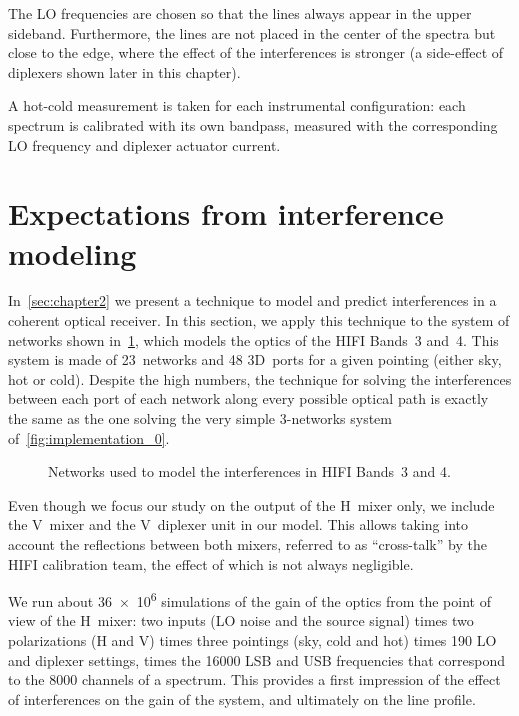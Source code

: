 The LO frequencies are chosen so that the lines always appear in the upper sideband.
Furthermore, the lines are not placed in the center of the spectra but close to the edge, where the effect of the interferences is stronger (a side-effect of diplexers shown later in this chapter).



A hot-cold measurement is taken for each instrumental configuration: each spectrum is calibrated with its own bandpass, measured with the corresponding LO frequency and diplexer actuator current.


\FloatBarrier
\section{Expectations from interference modeling}
\label{sec:s141_interf}
In~\cref{sec:chapter2} we present a technique to model and predict interferences in a coherent optical receiver.
In this section, we apply this technique to the system of networks shown in~\cref{fig:band45_networks}, which models the optics of the HIFI Bands~3 and~4.
This system is made of 23~networks and 48 3D~ports for a given pointing (either sky, hot or cold).
Despite the high numbers, the technique for solving the interferences between each port of each network along every possible optical path is exactly the same as the one solving the very simple 3-networks system of~\vref{fig:implementation_0}.

\begin{figure}
    \centering
    
    \caption{Networks used to model the interferences in HIFI Bands~3 and 4.}
    \label{fig:band45_networks}
\end{figure}

Even though we focus our study on the output of the H~mixer only, we include the V~mixer and the V~diplexer unit in our model.
This allows taking into account the reflections between both mixers, referred to as ``cross-talk'' by the HIFI calibration team, the effect of which is not always negligible.

We run about \num{36e6} simulations of the gain of the optics from the point of view of the H~mixer: two inputs (LO noise and the source signal) times two polarizations (H and V) times three pointings (sky, cold and hot) times 190 LO and diplexer settings, times the \num{16000} LSB and USB frequencies that correspond to the 8000 channels of a spectrum.
This provides a first impression of the effect of interferences on the gain of the system, and ultimately on the line profile.

